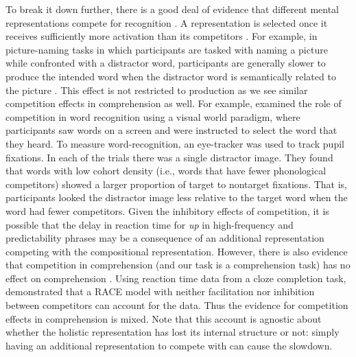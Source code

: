\documentclass[
  authoryear,
  preprint,
  1p,
  onecolumn]{elsarticle}
\begin{document}
To break it down further, there is a good deal of evidence that
different mental representations compete for recognition
\citetext{\citealp{oppenheimLexicalCompetitionDemand2019}; \citealp[c.f.][]{staubInfluenceClozeProbability2015}}.
A representation is selected once it receives sufficiently more
activation than its competitors
\citep{mcclellandInteractiveActivationModel1981}. For example, in
picture-naming tasks in which participants are tasked with naming a
picture while confronted with a distractor word, participants are
generally slower to produce the intended word when the distractor word
is semantically related to the picture
\citep{starreveldSemanticInterferenceOrthographic1995, schriefersExploringTimeCourse1990, mcclellandInteractiveActivationModel1981}.
This effect is not restricted to production as we see similar
competition effects in comprehension as well. For example,
\citet{magnuson2007} examined the role of competition in word
recognition using a visual world paradigm, where participants saw words
on a screen and were instructed to select the word that they heard. To
measure word-recognition, an eye-tracker was used to track pupil
fixations. In each of the trials there was a single distractor image.
They found that words with low cohort density (i.e., words that have
fewer phonological competitors) showed a larger proportion of target to
nontarget fixations. That is, participants looked the distractor image
less relative to the target word when the word had fewer competitors.
Given the inhibitory effects of competition, it is possible that the
delay in reaction time for \emph{up} in high-frequency and
predictability phrases may be a consequence of an additional
representation competing with the compositional representation. However,
there is also evidence that competition in comprehension (and our task
is a comprehension task) has no effect on comprehension
\citep{staubInfluenceClozeProbability2015}. Using reaction time data
from a cloze completion task, \citet{staubInfluenceClozeProbability2015}
demonstrated that a RACE model with neither facilitation nor inhibition
between competitors can account for the data. Thus the evidence for
competition effects in comprehension is mixed. Note that this account is
agnostic about whether the holistic representation has lost its internal
structure or not: simply having an additional representation to compete
with can cause the slowdown.
\end{document}
